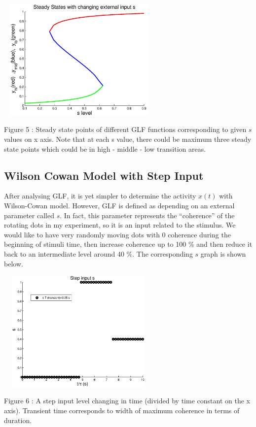 \documentclass[twocolumn]{article}
\begin{document}
\begin{center}
\includegraphics[width=80mm,height=60mm]{s_vs_steadystate.eps} 
   \begin{footnotesize} Figure 5 : Steady state points of different GLF functions corresponding to given $s$ values on x axis. Note that at each s value, there could be maximum three steady state points which could be in high - middle - low transition areas. \end{footnotesize}
\end{center}


\subsection{Wilson Cowan Model with Step Input}
After analysing GLF, it is yet simpler to determine the activity $x(t)$ with Wilson-Cowan model. However, GLF is defined as depending on an external parameter called $s$. In fact, this parameter represents the ``coherence'' of the rotating dots in my experiment, so it is an input related to the stimulus. We would like to have very randomly moving dots with 0 coherence during the beginning of stimuli time, then increase coherence up to 100 \% and then reduce it back to an intermediate level around 40 \%. The corresponding $s$ graph is shown below. 

 \begin{center}
\includegraphics[width=80mm,height=60mm]{step_s.eps} 
   \begin{footnotesize} Figure 6 : A step input level changing in time (divided by time constant on the x axis).  Transient time corresponds to width of maximum coherence in terms of duration. \end{footnotesize}
\end{center}
\end{document}
